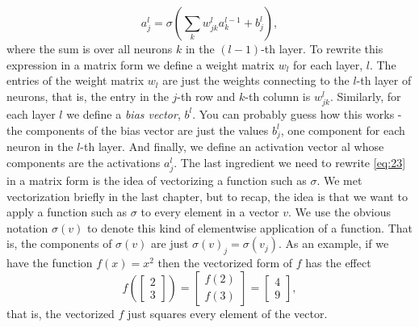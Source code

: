 \documentclass[a4paper,twoside,10pt]{book}
\begin{document}
\begin{equation}
	a^{l}_j = \sigma\left( \sum_k w^{l}_{jk} a^{l-1}_k + b^l_j \right),\label{eq:23}
\end{equation}
where the sum is over all neurons $k$ in the $(l−1)$-th layer. To rewrite this expression in a matrix form we define a weight matrix $w_l$ for each layer, $l$. The entries of the weight matrix $w_l$ are just the weights connecting to the $l$-th layer of neurons, that is, the entry in the $j$-th row and $k$-th column is $w^l_{jk}$. Similarly, for each layer $l$ we define a \textit{bias vector}, $b^l$. You can probably guess how this works - the components of the bias vector are just the values $b^l_j$, one component for each neuron in the $l$-th layer. And finally, we define an activation vector al whose components are the activations $a^l_j$.
The last ingredient we need to rewrite \ref{eq:23} in a matrix form is the idea of vectorizing a function such as $\sigma$. We met vectorization briefly in the last chapter, but to recap, the idea is that we want to apply a function such as $\sigma$ to every element in a vector $v$. We use the obvious notation $\sigma(v)$ to denote this kind of elementwise application of a function. That is, the components of $\sigma(v)$ are just $\sigma(v)_j = \sigma(v_j)$. As an example, if we have the function $f(x)=x^2$ then the vectorized form of $f$ has the effect
\begin{equation}
f\left(\left[ \begin{array}{c} 2 \\ 3 \end{array} \right] \right)
= \left[ \begin{array}{c} f(2) \\ f(3) \end{array} \right]
= \left[ \begin{array}{c} 4 \\ 9 \end{array} \right],
\label{eq:24}
\end{equation}
that is, the vectorized $f$ just squares every element of the vector.
\end{document}
